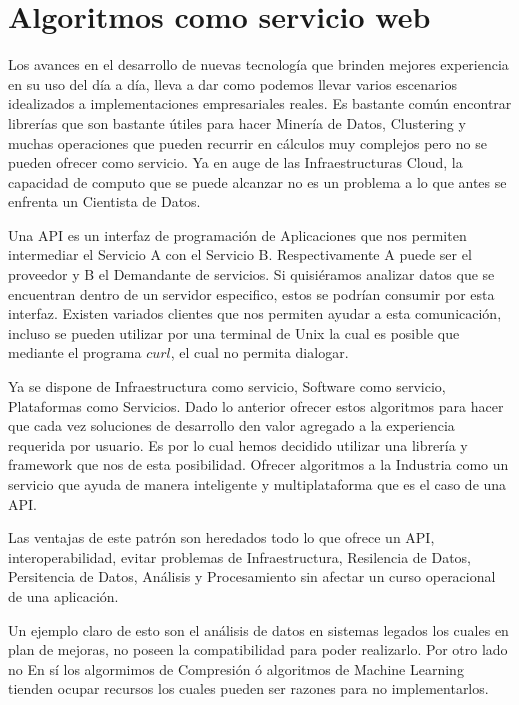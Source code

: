 \section{Algoritmos como servicio web }

	Los avances en el desarrollo de nuevas tecnología que brinden mejores experiencia en su uso del día a día, lleva a dar como podemos llevar varios escenarios idealizados a implementaciones empresariales reales. Es bastante común encontrar librerías que son bastante útiles para hacer Minería de Datos, Clustering y muchas operaciones que pueden recurrir en cálculos muy complejos pero no se pueden ofrecer como servicio. Ya en auge de las Infraestructuras Cloud, la capacidad de computo que se puede alcanzar no es un problema a lo que antes se enfrenta un Cientista de Datos.


	Una API es un interfaz de programación de Aplicaciones que nos permiten intermediar el Servicio A con el Servicio B. Respectivamente A puede ser el proveedor y B el Demandante de servicios. Si quisiéramos analizar datos que se encuentran dentro de un servidor especifico, estos se podrían consumir por esta interfaz. Existen variados clientes que nos permiten ayudar a esta comunicación, incluso se pueden utilizar por una terminal de Unix la cual es posible que mediante el programa $curl$, el cual no permita dialogar.
	
	Ya se dispone de Infraestructura como servicio, Software como servicio, Plataformas como Servicios. Dado lo anterior ofrecer estos algoritmos para hacer que cada vez soluciones de desarrollo den valor agregado a la experiencia requerida por usuario. 
	Es por lo cual hemos decidido utilizar una librería y framework que nos de esta posibilidad. Ofrecer algoritmos a la Industria como un servicio que ayuda de manera inteligente y multiplataforma  que es el caso de una API. 
	
	Las ventajas de este patrón son heredados  todo lo que ofrece un API, interoperabilidad, evitar problemas de Infraestructura, Resilencia de Datos, Persitencia de Datos, Análisis y Procesamiento sin afectar un curso operacional de una aplicación.
	
	Un ejemplo claro de esto son el análisis de datos en sistemas legados los cuales en plan de mejoras, no poseen la compatibilidad para poder realizarlo. Por otro lado no En sí los algormimos de Compresión ó algoritmos de Machine Learning tienden ocupar recursos los cuales pueden ser razones para no implementarlos.
	
	
	
	